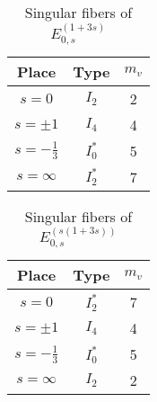 \documentclass[main]{subfiles}
\begin{document}
\begin{table}[h]
  \centering
  \caption{Singular fibers of $E_{0,s}^{(1 + 3s)}$}
  \begin{tabular}{|c|c|c|}
      \hline
      Place            & Type    & $m_v$ \\
      \hline
      $s=0$            & $I_2$   & 2     \\
      $s=\pm 1$        & $I_4$   & 4     \\
      $s=-\frac{1}{3}$ & $I_0^*$ & 5     \\
      $s=\infty$       & $I_2^*$ & 7     \\
      \hline
  \end{tabular}
\end{table}

\begin{table}[h]
  \centering
  \caption{Singular fibers of $E_{0,s}^{(s(1 + 3s))}$}
  \begin{tabular}{|c|c|c|}
      \hline
      Place            & Type    & $m_v$ \\
      \hline
      $s=0$            & $I_2^*$ & 7     \\
      $s=\pm 1$        & $I_4$   & 4     \\
      $s=-\frac{1}{3}$ & $I_0^*$ & 5     \\
      $s=\infty$       & $I_2$   & 2     \\
      \hline
  \end{tabular}
\end{table}
\end{document}
